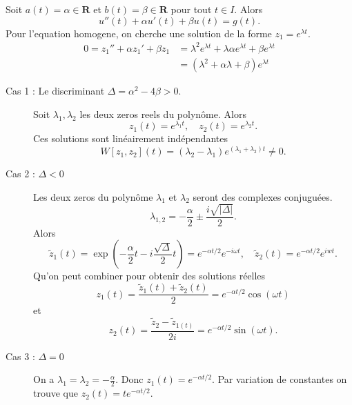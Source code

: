 Soit $a(t)=\alpha \in \mathbf{R}$ et $b(t)=\beta \in \mathbf{R}$ pour tout $t\in I$. Alors
$$
u''(t)+\alpha u'(t)+\beta u(t)=g(t).
$$
Pour l'equation homogene, on cherche une solution de la forme $z_{1}=e^{ \lambda t }$.
\begin{align*}
0=z_{1}''+\alpha z_{1}'+\beta z_{1} & =\lambda^{2}e^{ \lambda t }+\lambda \alpha e^{ \lambda t }+\beta e^{ \lambda t } \\
 & = (\lambda^{2}+\alpha\lambda +\beta )e^{ \lambda t }
\end{align*}
\begin{description}
\item[Cas 1 : Le discriminant $\Delta=\alpha^{2}-4\beta> 0$.]  Soit $\lambda_{1},\lambda_{2}$ les deux zeros reels du polynôme. Alors
$$
z_{1}(t)=e^{ \lambda_{1}t },\quad z_{2}(t)=e^{ \lambda_{2}t }.
$$
Ces solutions sont linéairement indépendantes
$$
W[z_{1},z_{2}](t)=(\lambda_{2}-\lambda_{1})e^{ (\lambda_{1}+\lambda_{2})t }\neq  0.
$$
\item[Cas 2 : $\Delta < 0$] Les deux zeros du polynôme $\lambda_{1}$ et $\lambda_{2}$ seront des complexes conjuguées.
$$
\lambda _{1,2}=-\frac{\alpha}{2}\pm \frac{i\sqrt{ |\Delta| }}{2}.
$$
Alors
$$
\tilde{z}_{1}(t)=\exp\left( -\frac{\alpha}{2}t-i \frac{\sqrt{ \Delta }}{2}t \right)=e^{ -\alpha t/2 }e^{ -i\omega t },\quad \tilde{z}_{2}(t)=e^{ -\alpha t/2 }e^{ iwt }.
$$
Qu'on peut combiner pour obtenir des solutions réelles
$$
z_{1}(t)=\frac{\tilde{z}_{1}(t)+\tilde{z}_{2}(t)}{2}=e^{ -\alpha t/2 }\cos(\omega t)
$$
et
$$
z_{2}(t)=\frac{\tilde{z}_{2}-\tilde{z}_{1(t)}}{2i}=e^{ -\alpha t/2 }\sin(\omega t).
$$
\item[Cas 3 : $\Delta =0$] On a $\lambda_{1}=\lambda_{2}=-\frac{\alpha}{2}$. Donc $z_{1}(t)=e^{ -\alpha t/2 }$. Par variation de constantes on trouve que $z_{2}(t)=te^{ -\alpha t/2 }$.
\end{description}